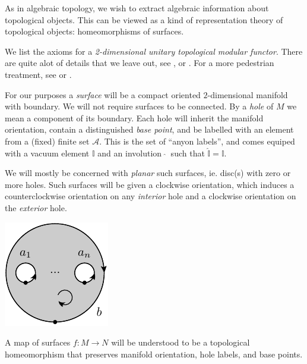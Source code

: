 \documentclass[aps, prl, letterpaper, twocolumn, superscriptaddress, notitlepage, 10pt]{revtex4-1}
\newcommand{\vac}{\mathbb{I}}
\newcommand{\A}{\mathcal{A}}
\begin{document}
As in algebraic topology, we wish to extract
algebraic information about topological objects.
This can be viewed as a kind of representation theory
of topological objects: homeomorphisms of surfaces.

We list the axioms for a 
\emph{2-dimensional unitary topological modular functor}.
There are quite alot of details that we leave out,
see
\cite{Turaev1994}, \cite{Walker1991} or \cite{Bakalov2000}.
For a more pedestrian treatment, see \cite{Freedman2002simulation} or \cite{Beverland2014}.

For our purposes a \emph{surface} will be a compact
oriented $2$-dimensional manifold with boundary. %
We will not require surfaces to be connected.
By a \emph{hole} of $M$ we mean a component of its boundary. %
Each hole will inherit the manifold orientation,
contain a distinguished \emph{base point},
and be labelled with
an element from a (fixed) finite set $\A.$
This is the set of ``anyon labels'', and comes
equiped with a vacuum element $\vac$ 
and an involution $\ \widehat{}\ $ such that $\widehat{\vac}=\vac.$

We will mostly be concerned with \emph{planar} such
surfaces, ie. disc(s) with zero or more holes.
Such surfaces will be given a clockwise 
orientation, which induces a counterclockwise orientation on
any \emph{interior} hole and a clockwise orientation
on the \emph{exterior} hole.
\begin{center}
\includegraphics[]{pic-disc.pdf}
\end{center}

A map of surfaces $f:M\to N$ will be understood to be
a topological homeomorphism that preserves
manifold orientation, hole labels, and base points.
\end{document}
